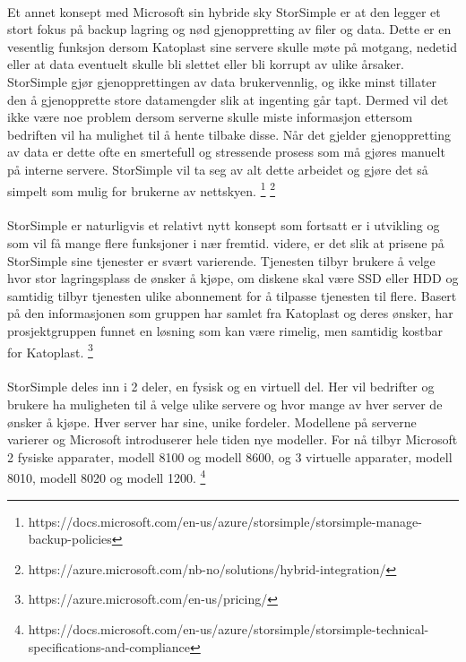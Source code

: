 \paragraph{} Et annet konsept med Microsoft sin hybride sky StorSimple er at den legger et stort fokus på backup lagring og nød gjenoppretting av filer og data. Dette er en vesentlig funksjon dersom Katoplast sine servere skulle møte på motgang, nedetid eller at data eventuelt skulle bli slettet eller bli korrupt av ulike årsaker. StorSimple gjør gjenopprettingen av data brukervennlig, og ikke minst tillater den å gjenopprette store datamengder slik at ingenting går tapt. Dermed vil det ikke være noe problem dersom serverne skulle miste informasjon ettersom bedriften vil ha mulighet til å hente tilbake disse. Når det gjelder gjenoppretting av data er dette ofte en smertefull og stressende prosess som må gjøres manuelt på interne servere. StorSimple vil ta seg av alt dette arbeidet og gjøre det så simpelt som mulig for brukerne av nettskyen.
\footnote{https://docs.microsoft.com/en-us/azure/storsimple/storsimple-manage-backup-policies}
\footnote{https://azure.microsoft.com/nb-no/solutions/hybrid-integration/}

\paragraph{} StorSimple er naturligvis et relativt nytt konsept som fortsatt er i utvikling og som vil få mange flere funksjoner i nær fremtid. videre, er det slik at prisene på StorSimple sine tjenester er svært varierende. Tjenesten tilbyr brukere å velge hvor stor lagringsplass de ønsker å kjøpe, om diskene skal være SSD eller HDD og samtidig tilbyr tjenesten ulike abonnement for å tilpasse tjenesten til flere. Basert på den informasjonen som gruppen har samlet fra Katoplast og deres ønsker, har prosjektgruppen funnet en løsning som kan være rimelig, men samtidig kostbar for Katoplast.
\footnote{https://azure.microsoft.com/en-us/pricing/}

\paragraph{} StorSimple deles inn i 2 deler, en fysisk og en virtuell del. Her vil bedrifter og brukere ha muligheten til å velge ulike servere og hvor mange av hver server de ønsker å kjøpe. Hver server har sine, unike fordeler. Modellene på serverne varierer og Microsoft introduserer hele tiden nye modeller. For nå tilbyr Microsoft 2 fysiske apparater, modell 8100 og modell 8600, og 3 virtuelle apparater, modell 8010, modell 8020 og modell 1200. 
\footnote{https://docs.microsoft.com/en-us/azure/storsimple/storsimple-technical-specifications-and-compliance}

